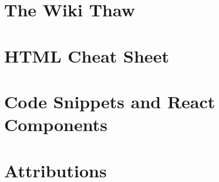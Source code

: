 \documentclass[a4paper, 11pt, twoside]{book}
\begin{document}
\chapter{The Wiki Thaw} \label{ch:thaw}
%
\newpage
%
\chapter{HTML Cheat Sheet} \label{ch:htmlcheatsheet}
%
\newpage
%
\chapter{Code Snippets and React Components} \label{ch:appendix}
%
\newpage

\backmatter
{}
\pagecolor{pgcolor}

\chapter{Attributions} \label{ch:attributions}

\end{document}
